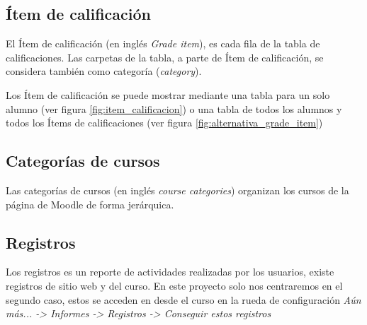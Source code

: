 \subsection{Ítem de calificación}
El Ítem de calificación\cite{noauthor_grade_nodate} (en inglés \textit{Grade item}), es cada fila de la tabla de calificaciones.
Las carpetas de la tabla, a parte de Ítem de calificación, se considera también como categoría (\textit{category}).

Los Ítem de calificación se puede mostrar mediante una tabla para un solo alumno (ver figura \ref{fig:item_calificacion}) o una tabla de todos los alumnos y todos los Ítems de calificaciones (ver figura \ref{fig:alternativa_grade_item})
	


\subsection{Categorías de cursos}
Las categorías de cursos\cite{noauthor_course_nodate-1} (en inglés \textit{course categories}) organizan los cursos de la página de Moodle de forma jerárquica.


\subsection{Registros}
Los registros es un reporte de actividades realizadas por los usuarios, existe registros de sitio web y del curso. En este proyecto solo nos centraremos en el segundo caso, estos se acceden en desde el curso en la rueda de configuración \textit{Aún más... ->  Informes ->  Registros -> Conseguir estos registros}


